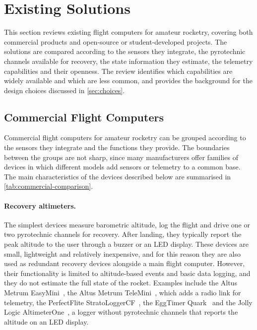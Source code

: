 
\section{Existing Solutions}
\label{sec:existing}

This section reviews existing flight computers for amateur rocketry, covering both commercial products and open-source or student-developed projects. The solutions are compared according to the sensors they integrate, the pyrotechnic channels available for recovery, the state information they estimate, the telemetry capabilities and their openness. The review identifies which capabilities are widely available and which are less common, and provides the background for the design choices discussed in \cref{sec:choices}.

\subsection{Commercial Flight Computers}

Commercial flight computers for amateur rocketry can be grouped according to the sensors they integrate and the functions they provide. The boundaries between the groups are not sharp, since many manufacturers offer families of devices in which different models add sensors or telemetry to a common base. The main characteristics of the devices described below are summarised in \cref{tab:commercial-comparison}.

\paragraph{Recovery altimeters.} The simplest devices measure barometric altitude, log the flight and drive one or two pyrotechnic channels for recovery. After landing, they typically report the peak altitude to the user through a buzzer or an LED display. These devices are small, lightweight and relatively inexpensive, and for this reason they are also used as redundant recovery devices alongside a main flight computer. However, their functionality is limited to altitude-based events and basic data logging, and they do not estimate the full state of the rocket. Examples include the Altus Metrum EasyMini~\cite{altus:easymini}, the Altus Metrum TeleMini~\cite{altus:telemini}, which adds a radio link for telemetry, the PerfectFlite StratoLoggerCF~\cite{perfectflite}, the EggTimer Quark~\cite{eggtimer:quark} and the Jolly Logic AltimeterOne~\cite{jollylogic:altimeterone}, a logger without pyrotechnic channels that reports the altitude on an LED display.


